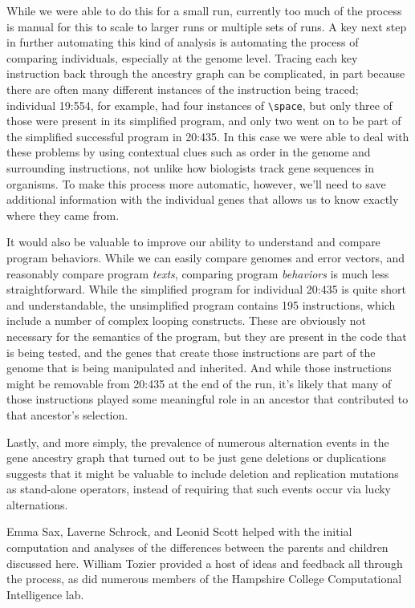 While we were able to do this for a small run, currently too much of the
process is manual for this to scale to larger runs or multiple sets of runs.
A key next step in further automating this kind of analysis is automating the 
process of comparing individuals, especially at the genome level. Tracing
each key instruction back through the ancestry graph can be complicated, in
part because there are often many different instances of the instruction being traced; individual 19:554, for example, had four instances of 
\texttt{\textbackslash space}, but only three of those were present in its
simplified program, and only two went on to be part of the simplified
successful program in 20:435. In this case we were able to deal with these
problems by using contextual clues such as order in the genome and surrounding
instructions, not unlike how biologists track gene sequences in organisms.
To make this process more automatic, however, we'll need to save additional
information with the individual genes that allows us to know exactly where they 
came from.

It would also be valuable to improve our ability to understand and compare
program behaviors. While we can easily compare genomes and error vectors,
and reasonably compare program \emph{texts}, comparing program \emph{behaviors}
is much less straightforward. While the simplified program for individual
20:435 is quite short and understandable, the unsimplified program contains
195 instructions, which include a number of complex looping constructs. These
are obviously not necessary for the semantics of the program, but they are
present in the code that is being tested, and the genes that create those
instructions are part of the genome that is being manipulated and inherited.
And while those instructions might be removable from 20:435 at the end 
of the run, it's likely that many of those instructions played some
meaningful role in an ancestor that contributed to that ancestor's selection.

Lastly, and more simply, the prevalence of numerous alternation events in the 
gene ancestry graph that turned out to be just gene deletions or duplications 
suggests that it might be valuable to include deletion and replication 
mutations as stand-alone operators, instead of requiring that such events
occur via lucky alternations.





\begin{acknowledgement}
	Emma Sax, Laverne Schrock, and Leonid Scott helped 
	with the initial computation and analyses of the differences between the 
	parents and children discussed here. William Tozier provided a host of 
	ideas and feedback all through the process, as did numerous members
	of the Hampshire College Computational Intelligence lab.
\end{acknowledgement}



